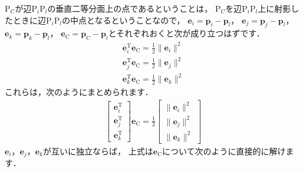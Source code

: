 ﻿\documentclass[a4paper]{jsarticle}
\begin{document}
$\mathrm{P}_{\mathrm{C}}$が辺$\mathrm{P}_{i}\mathrm{P}_{l}$の垂直二等分面上の点であるということは，
$\mathrm{P}_{\mathrm{C}}$を辺$\mathrm{P}_{i}\mathrm{P}_{l}$上に射影したときに辺$\mathrm{P}_{i}\mathrm{P}_{l}$の中点となるということなので，
$\boldsymbol{e}_{i}=\boldsymbol{p}_{i}-\boldsymbol{p}_{l}$，
$\boldsymbol{e}_{j}=\boldsymbol{p}_{j}-\boldsymbol{p}_{l}$，
$\boldsymbol{e}_{k}=\boldsymbol{p}_{k}-\boldsymbol{p}_{l}$，
$\boldsymbol{e}_{\mathrm{C}}=\boldsymbol{p}_{\mathrm{C}}-\boldsymbol{p}_{l}$とそれぞれおくと次が成り立つはずです．
\begin{align*}
\boldsymbol{e}_{i}^{\mathrm{T}}\boldsymbol{e}_{\mathrm{C}}=\frac{1}{2}\|\boldsymbol{e}_{i}\|^{2}
\\
\boldsymbol{e}_{j}^{\mathrm{T}}\boldsymbol{e}_{\mathrm{C}}=\frac{1}{2}\|\boldsymbol{e}_{j}\|^{2}
\\
\boldsymbol{e}_{k}^{\mathrm{T}}\boldsymbol{e}_{\mathrm{C}}=\frac{1}{2}\|\boldsymbol{e}_{k}\|^{2}
\end{align*}
これらは，次のようにまとめられます．
\begin{align*}
\begin{bmatrix} \boldsymbol{e}_{i}^{\mathrm{T}} \\ \boldsymbol{e}_{j}^{\mathrm{T}} \\ \boldsymbol{e}_{k}^{\mathrm{T}} \end{bmatrix}
\boldsymbol{e}_{\mathrm{C}}=
\frac{1}{2}
\begin{bmatrix} \|\boldsymbol{e}_{i}\|^{2} \\ \|\boldsymbol{e}_{j}\|^{2} \\ \|\boldsymbol{e}_{k}\|^{2} \end{bmatrix}
\end{align*}
$\boldsymbol{e}_{i}$，$\boldsymbol{e}_{j}$，$\boldsymbol{e}_{k}$が互いに独立ならば，
上式は$\boldsymbol{e}_{\mathrm{C}}$について次のように直接的に解けます．
\end{document}
